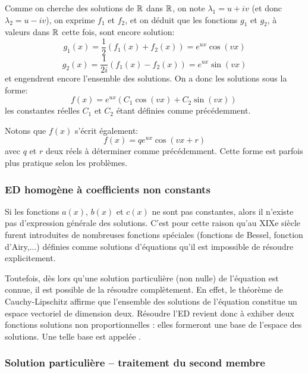 \medskip
Comme on cherche des solutions de $\mathbb R$ dans $\mathbb R$, on note $\lambda_1 = u + iv$ (et
donc $\lambda_2 = u-iv$), on exprime $f_1$ et $f_2$, et on déduit que les fonctions
$g_1$ et $g_2$, à valeurs dans $\mathbb R$ cette fois, sont encore solution:
\begin{equation}
    g_1(x) =\frac 12 (f_1(x) + f_2(x) )= e^{ux}\cos(vx)
\end{equation}
\begin{equation}
    g_2(x) = \frac{1}{2i}(f_1(x) - f_2(x)) = e^{ux}\sin(vx) 
\end{equation}
et engendrent encore l'ensemble des solutions.
On a donc les solutions sous la forme:
\begin{equation}
f(x) = e^{ux}(C_1\cos(vx) + C_2\sin(vx))\,
\end{equation}
les constantes réelles $C_1$ et $C_2$ étant définies comme précédemment.

Notons que $f(x)$ s'écrit également:
\begin{equation}
f(x) = q e^{ux}\cos(vx+r)
\end{equation}
avec $q$ et $r$ deux réels à déterminer comme précédemment.
Cette forme est parfois plus pratique selon les problèmes.


\medskip
\subsubsection{ED homogène à coefficients non constants}

Si les fonctions $a(x)$, $b(x)$ et $c(x)$ ne sont pas constantes, alors
il n'existe pas d'expression générale des solutions.
C'est pour cette raison qu'au XIXe siècle furent introduites de nombreuses fonctions spéciales 
(fonctions de Bessel, fonction d'Airy,...) définies comme solutions d'équations qu'il est impossible 
de résoudre explicitement. 

\medskip
Toutefois, dès lors qu'une solution particulière (non nulle) de l'équation est connue,
il est possible de la résoudre complètement.
En effet, le théorème de Cauchy-Lipschitz affirme que l'ensemble des solutions de l'équation 
constitue un espace vectoriel de dimension deux. 
Résoudre l'ED revient donc à exhiber deux fonctions solutions non proportionnelles : elles formeront 
une base de l'espace des solutions. 
Une telle base est appelée .

\medskip
\subsubsection{Solution particulière  -- traitement du second membre}

